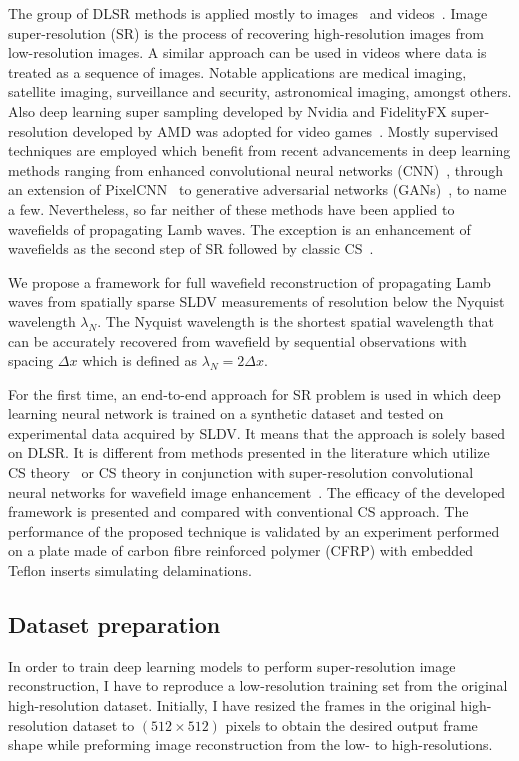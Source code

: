 The group of DLSR methods is applied mostly to images~\cite{Dahl2017,Zhang2018,Wang2019} and videos~\cite{Zhang2017,Yan2019}.
Image super-resolution (SR) is the process of recovering high-resolution images from low-resolution images.
A similar approach can be used in videos where data is treated as a sequence of images.
Notable applications are medical imaging, satellite imaging, surveillance and security, astronomical imaging, amongst others.
Also deep learning super sampling developed by Nvidia and FidelityFX super-resolution developed by AMD was adopted for video games~\cite{Claypool2006}.
Mostly supervised techniques are employed
which benefit from recent advancements in deep learning methods ranging from enhanced convolutional neural networks (CNN)~\cite{Zhang2017}, through an extension of PixelCNN~\cite{Dahl2017} to generative adversarial networks (GANs)~\cite{Wang2019}, to name a few.
Nevertheless, so far neither of these methods have been applied to wavefields of propagating Lamb waves.
The exception is an enhancement of wavefields as the second step of SR followed by classic CS~\cite{Park2017a,KeshmiriEsfandabadi2020}.

We propose a framework for full wavefield reconstruction of propagating Lamb waves from spatially sparse SLDV measurements of resolution below the Nyquist wavelength $\lambda_N$. 
The Nyquist wavelength is the shortest spatial wavelength that can be accurately recovered from wavefield by sequential observations with spacing $\Delta x$ which is defined as $\lambda_N = 2 \Delta x$. 

For the first time, an end-to-end approach for SR problem is used in which deep learning neural network is trained on a synthetic dataset and tested on experimental data acquired by SLDV.
It means that the approach is solely based on DLSR.
It is different from methods presented in the literature which utilize CS theory~\cite{Harley2013,KeshmiriEsfandabadi2018} or CS theory in conjunction with super-resolution convolutional neural networks for wavefield image enhancement~\cite{Park2017a,KeshmiriEsfandabadi2020}.
The efficacy of the developed framework is presented and compared with conventional CS approach.  
The performance of the proposed technique is validated by an experiment performed on a plate made of carbon fibre reinforced polymer (CFRP) with embedded Teflon inserts simulating delaminations.

\subsection{Dataset preparation}
\label{sec62}
In order to train deep learning models to perform super-resolution image reconstruction, I have to reproduce a low-resolution training set from the original high-resolution dataset. 
Initially, I have resized the frames in the original high-resolution dataset to \((512\times512)\) pixels to obtain the desired output frame shape while preforming image reconstruction from the low- to high-resolutions.

